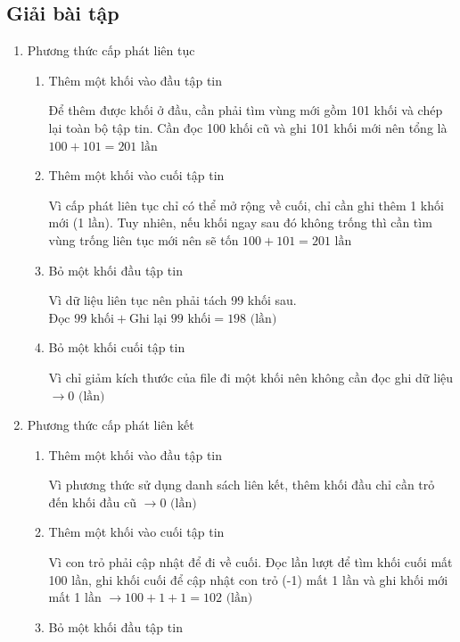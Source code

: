 \documentclass[12pt, letterpaper]{article}
\begin{document}
\subsection{Giải bài tập}
\begin{enumerate}
    \item Phương thức cấp phát liên tục
            \begin{enumerate}[label=\alph*)]
                \item Thêm một khối vào đầu tập tin
                
                Để thêm được khối ở đầu, cần phải tìm vùng mới gồm 101 khối và chép lại toàn bộ tập tin. Cần đọc 100 khối cũ và ghi 101 khối mới nên tổng là $100 + 101 = 201 \text{ lần}$
                \item Thêm một khối vào cuối tập tin
                
                Vì cấp phát liên tục chỉ có thể mở rộng về cuối, chỉ cần ghi thêm 1 khối mới (1 lần). Tuy nhiên, nếu khối ngay sau đó không trống thì cần tìm vùng trống liên tục mới nên sẽ tốn $100 + 101 = 201 \text{ lần}$
                \item Bỏ một khối đầu tập tin
                
                Vì dữ liệu liên tục nên phải tách 99 khối sau. $\text{Đọc 99 khối} + \text{Ghi lại 99 khối} = 198 \text{ (lần)} $
                \item Bỏ một khối cuối tập tin
                
                Vì chỉ giảm kích thước của file đi một khối nên không cần đọc ghi dữ liệu $\rightarrow 0 \text{ (lần)} $
            \end{enumerate}
    \item Phương thức cấp phát liên kết
            \begin{enumerate}[label=\alph*)]
                \item Thêm một khối vào đầu tập tin
                
                Vì phương thức sử dụng danh sách liên kết, thêm khối đầu chỉ cần trỏ đến khối đầu cũ $\rightarrow 0 \text{ (lần)} $
                \item Thêm một khối vào cuối tập tin
                
                Vì con trỏ phải cập nhật để đi về cuối. Đọc lần lượt để tìm khối cuối mất 100 lần, ghi khối cuối để cập nhật con trỏ (-1) mất 1 lần và ghi khối mới mất 1 lần $\rightarrow 100 + 1 + 1 = 102 \text{ (lần)} $
                \item Bỏ một khối đầu tập tin


\end{enumerate}
\end{enumerate}
\end{document}
